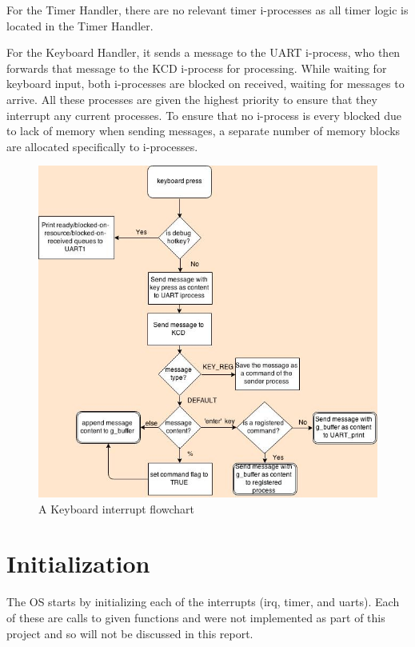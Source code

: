 \documentclass[11pt, oneside]{article}
\begin{document}
For the Timer Handler, there are no relevant timer i-processes as all timer logic is located in the Timer Handler. 

For the Keyboard Handler, it sends a message to the UART i-process, who then forwards that message to the KCD i-process for processing. While waiting for keyboard input, both i-processes are blocked on received, waiting for messages to arrive. All these processes are given the highest priority to ensure that they interrupt any current processes. To ensure that no i-process is every blocked due to lack of memory when sending messages, a separate number of memory blocks are allocated specifically to i-processes.

\begin{figure}[ht!]
\centering
\includegraphics[width=150mm]{Keyboard_interrupt.jpg}
\caption{A Keyboard interrupt flowchart \label{overflow}}
\end{figure}

\section{Initialization}
The OS starts by initializing each of the interrupts (irq, timer, and uarts). Each of these are calls to given functions and were not implemented as part of this project and so will not be discussed in this report.
\end{document}
